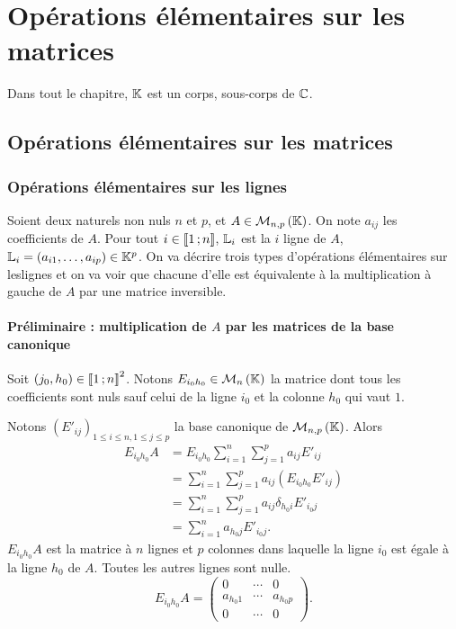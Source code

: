 \chapter{Opérations élémentaires sur les matrices}\label{chap:operationssurlesmatrices}
\minitoc%
\minilof%
\minilot%

Dans tout le chapitre, \(\mathbb{K}\) est un corps, sous-corps de \(\mathbb{C}\).

\section{Opérations élémentaires sur les matrices}

\subsection{Opérations élémentaires sur les lignes}

Soient deux naturels non nuls \(n\) et \(p\), et \(A \in \mathcal{M}_{n,p}\left(\mathbb{K}\right)\). On
note \(a_{ij}\) les coefficients de \(A\). Pour tout \(i \in
\mathopen{\llbracket}1\mathclose{}\mathpunct{};n\mathclose{\rrbracket}\), \(\mathbb{L}_i\) est la \(i\)\ieme{} ligne de \(A\), \(\mathbb{L}_i
=(a_{i1}, \ldots, a_{ip}) \in \mathbb{K}^p\). On va décrire trois types d'opérations
élémentaires sur leslignes et on va voir que chacune d'elle est équivalente à la
multiplication à gauche de \(A\) par une matrice inversible.
%
\subsubsection{Préliminaire : multiplication de \(A\) par les matrices de la
base canonique}
Soit \((j_0,h_0) \in \mathopen{\llbracket}1\mathclose{}\mathpunct{};n\mathclose{\rrbracket}^2\). Notons \(E_{i_0h_0} \in
\mathcal{M}_{n}\left(\mathbb{K}\right)\) la matrice dont tous les coefficients sont nuls sauf celui de la
ligne \(i_0\) et la colonne \(h_0\) qui vaut \(1\).

Notons \((E'_{ij})_{1\leqslant i \leqslant n, 1\leqslant j \leqslant p}\) la
base canonique de \(\mathcal{M}_{n,p}\left(\mathbb{K}\right)\). Alors
\begin{align*}
  E_{i_0h_0} A &= E_{i_0h_0} \sum_{i = 1}^n \sum_{j = 1}^p a_{ij} E'_{ij} \\
               &= \sum_{i = 1}^n \sum_{j = 1}^p a_{ij} (E_{i_0h_0}E'_{ij})\\
               &= \sum_{i = 1}^n \sum_{j = 1}^p a_{ij} \delta_{h_0 i} E'_{i_0j}
               \\
               &= \sum_{i = 1}^na_{h_0j} E'_{i_0j}.
\end{align*}
\( E_{i_0h_0} A\) est la matrice à \(n\) lignes et \(p\) colonnes dans laquelle
la ligne \(i_0\) est égale à la ligne \(h_0\) de \(A\). Toutes les autres lignes
sont nulle.
\begin{equation}
  E_{i_0h_0} A =
  \begin{pmatrix}
    0 & \cdots & 0 \\
    a_{h_0 1}& \cdots & a_{h_0 p} \\
    0 & \cdots & 0
  \end{pmatrix}.
\end{equation}
%
